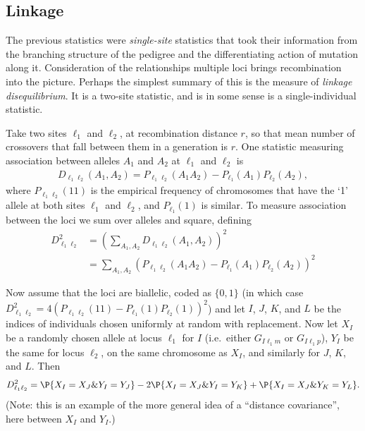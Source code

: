 \subsection{Linkage}

The previous statistics were \emph{single-site} statistics
that took their information from the branching structure of the pedigree
and the differentiating action of mutation along it.
Consideration of the relationships multiple loci brings recombination into the picture.
Perhaps the simplest summary of this is the measure of \emph{linkage disequilibrium}.
It is a two-site statistic, and is in some sense is a single-individual statistic.

Take two sites $\ell_1$ and $\ell_2$, at recombination distance $r$,
so that mean number of crossovers that fall between them in a generation is $r$.
One statistic measuring association between alleles $A_1$ and $A_2$ at $\ell_1$ and $\ell_2$ is
\begin{align}
  D_{\ell_1 \ell_2}(A_1,A_2) = P_{\ell_1 \ell_2}(A_1 A_2) - P_{\ell_1}(A_1) P_{\ell_2}(A_2) ,
\end{align}
where $P_{\ell_1 \ell_2}(11)$ is the empirical frequency of chromosomes that have the `1' allele at both sites $\ell_1$ and $\ell_2$,
and $P_{\ell_1}(1)$ is similar.
To measure association between the loci we sum over alleles and square, defining
\begin{align}
  D_{\ell_1 \ell_2}^2 &= \left( \sum_{A_1,A_2} D_{\ell_1 \ell_2}(A_1,A_2) \right)^2 \\
    &= \sum_{A_1,A_2} \left( P_{\ell_1 \ell_2}(A_1 A_2) - P_{\ell_1}(A_1) P_{\ell_2}(A_2) \right)^2
\end{align}


Now assume that the loci are biallelic, coded as $\{0,1\}$
(in which case $D_{\ell_1 \ell_2}^2  = 4 \left( P_{\ell_1 \ell_2}(1 1) - P_{\ell_1}(1) P_{\ell_2}(1) \right)^2$)
and let $I$, $J$, $K$, and $L$ be the indices of individuals chosen uniformly at random with replacement.
Now let $X_I$ be a randomly chosen allele at locus $\ell_1$ for $I$ (i.e.\ either $G_{I\ell_1m}$ or $G_{I\ell_1p}$),
$Y_I$ be the same for locus $\ell_2$, on the same chromosome as $X_I$,
and similarly for $J$, $K$, and $L$.
Then
\begin{align}
  D_{\ell_1 \ell_2}^2 = \P\{ X_I = X_J \& Y_I = Y_J \} - 2 \P\{ X_I = X_J \& Y_I = Y_K \} + \P\{ X_I = X_J \& Y_K = Y_L \} .
\end{align}
(Note: this is an example of the more general idea of a ``distance covariance'', here between $X_I$ and $Y_I$.)

